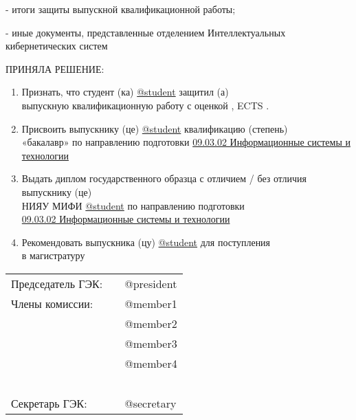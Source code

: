 \documentclass[a4paper,12pt]{article} %
\begin{document}
- итоги защиты выпускной квалификационной работы;

- иные документы, представленные отделением Интеллектуальных кибернетических систем

\par\smallskip

ПРИНЯЛА РЕШЕНИЕ:

\begin{enumerate}
	\item 	Признать, что студент (ка) \underline{@student} защитил (а) \\
	выпускную квалификационную работу с оценкой \makebox[10mm]{\hrulefill}\makebox[10mm]{\hrulefill}, ECTS \makebox[10mm]{\hrulefill}. 
	\vspace{-0.25cm}
	\item 	Присвоить выпускнику (це) \underline{@student} квалификацию (степень)\\ «бакалавр» по направлению подготовки \underline{09.03.02 Информационные системы и технологии} 
	\vspace{-0.75cm}
	\item 	Выдать диплом государственного образца с отличием / без отличия выпускнику (це) \\
	НИЯУ МИФИ \underline{@student} по направлению подготовки\\
	\underline{09.03.02 Информационные системы и технологии} 
	\vspace{-0.20cm}
	\item 	Рекомендовать выпускника (цу) \underline{@student}  для поступления\\
	 в магистратуру
	\vspace{-0.25cm}
\end{enumerate}
\par\bigskip
\begin{center} 	
	\begin{tabular}{lll}
		\vspace{0.3cm}
		Председатель ГЭК:\hspace{1cm} &\makebox[40mm]{\hrulefill} & @president  \\
		Члены комиссии:  \hspace{1cm} &\makebox[40mm]{\hrulefill}\par\medskip & @member1 \\
		
						 \hspace{1cm} &\makebox[40mm]{\hrulefill}\par\medskip & @member2  \\
					   	 \hspace{1cm} &\makebox[40mm]{\hrulefill}\par\medskip & @member3  \\
						 \hspace{1cm} &\makebox[40mm]{\hrulefill}\par\medskip & @member4  \\
		\ \\ %
		\vspace{0.3cm}			
		Секретарь ГЭК:   \hspace{1cm} & \makebox[40mm]{\hrulefill}  &@secretary  \\		
	\end{tabular}
\end{center}
\end{document}
